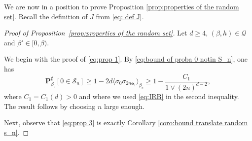 \documentclass[10pt,a4paper]{amsart}
\numberwithin{equation}{section}
\newcommand\fg{\mathfrak{g}}
\begin{document}
We are now in a position to prove Proposition \ref{prop:properties of the random set}. Recall the definition of $J$ from \eqref{eq: def J}.
\begin{proof}[Proof of Proposition~\textup{\ref{prop:properties of the random set}}] Let $d\geq 4$, $(\beta,h)\in \mathcal Q$ and $\beta'\in [0,\beta)$.

We begin with the proof of \eqref{eq:prop 1}. By \eqref{eq:bound of proba 0 notin S_n}, one has
\begin{equation}\label{eq:proof of prop 1}
	\mathbf P_{\beta_c}^\emptyset [0\in \mathcal S_n]\geq 1-2d\langle \sigma_0\sigma_{2n\mathbf{e}_1}\rangle_{\beta_c}\geq 1-\frac{C_1}{1\vee (2n)^{d-2}},
\end{equation} 
where $C_1=C_1(d)>0$ and where we used \eqref{eq:IRB} in the second inequality. The result follows by choosing $n$ large enough.

Next, observe that \eqref{eq:prop 3} is exactly Corollary \ref{coro:bound translate random s_n}.
	

\end{proof}
\end{document}

